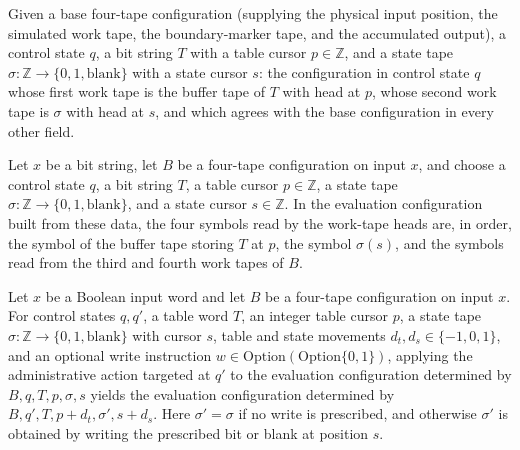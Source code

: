\begin{definition}
\label{Turing.universalEvalCfg}
\leanok
{}
Given a base four-tape configuration (supplying the physical input position,
the simulated work tape, the boundary-marker tape, and the accumulated
output), a control state $q$, a bit string $T$ with a table cursor
$p \in \mathbb{Z}$, and a state tape
$\sigma \colon \mathbb{Z} \to \{0, 1, \mathrm{blank}\}$ with a state cursor
$s$: the configuration in control state $q$ whose first work tape is the
buffer tape of $T$ with head at $p$, whose second work tape is $\sigma$ with
head at $s$, and which agrees with the base configuration in every other
field.
\end{definition}

\begin{lemma}
\label{Turing.universalEval_reads}
\leanok
{}
Let $x$ be a bit string, let $B$ be a four-tape configuration on input $x$, and choose a
control state $q$, a bit string $T$, a table cursor $p\in\mathbb{Z}$, a state tape
$\sigma\colon\mathbb{Z}\to\{0,1,\mathrm{blank}\}$, and a state cursor $s\in\mathbb{Z}$.
In the evaluation configuration built from these data, the four symbols read by the
work-tape heads are, in order, the symbol of the buffer tape storing $T$ at $p$, the
symbol $\sigma(s)$, and the symbols read from the third and fourth work tapes of $B$.
\end{lemma}

\begin{lemma}
\label{Turing.universalAdmin_apply}
\leanok
{}
Let $x$ be a Boolean input word and let $B$ be a four-tape configuration on input $x$.
For control states $q,q'$, a table word $T$, an integer table cursor $p$, a state tape
$\sigma\colon\mathbb{Z}\to\{0,1,\mathrm{blank}\}$ with cursor $s$, table and state
movements $d_t,d_s\in\{-1,0,1\}$, and an optional write instruction
$w\in\mathrm{Option}(\mathrm{Option}\{0,1\})$, applying the administrative action
targeted at $q'$ to the evaluation configuration determined by $B,q,T,p,\sigma,s$ yields
the evaluation configuration determined by $B,q',T,p+d_t,\sigma',s+d_s$. Here
$\sigma'=\sigma$ if no write is prescribed, and otherwise $\sigma'$ is obtained by
writing the prescribed bit or blank at position $s$.
\end{lemma}

